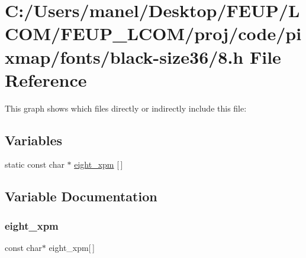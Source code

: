 \hypertarget{black-size36_28_8h}{}\section{C\+:/\+Users/manel/\+Desktop/\+F\+E\+U\+P/\+L\+C\+O\+M/\+F\+E\+U\+P\+\_\+\+L\+C\+O\+M/proj/code/pixmap/fonts/black-\/size36/8.h File Reference}
\label{black-size36_28_8h}
This graph shows which files directly or indirectly include this file\+:
\subsection*{Variables}
\begin{DoxyCompactItemize}
\item 
static const char $\ast$ \mbox{\hyperlink{black-size36_28_8h_ad9403f42cdfeb89550ff74b226b7627c}{eight\+\_\+xpm}} \mbox{[}$\,$\mbox{]}
\end{DoxyCompactItemize}


\subsection{Variable Documentation}
\mbox{\label{black-size36_28_8h_ad9403f42cdfeb89550ff74b226b7627c}} 
\subsubsection{\texorpdfstring{eight\_xpm}{eight\_xpm}}
{\footnotesize\ttfamily const char$\ast$ eight\+\_\+xpm\mbox{[}$\,$\mbox{]}\hspace{0.3cm}{\ttfamily [static]}}

